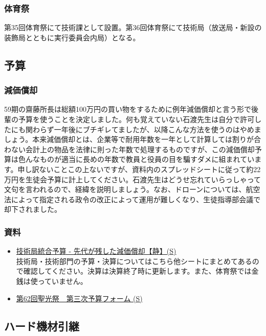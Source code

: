 \documentclass[dvipdfmx,jb5]{jarticle}
\begin{document}
\subsubsection{体育祭}
第35回体育祭にて技術課として設置。第36回体育祭にて技術局（放送局・新設の装飾局とともに実行委員会内局）となる。

\subsection{予算}\label{sec:予算}
\subsubsection{減価償却}
59期の齋藤所長は総額100万円の買い物をするために例年減価償却と言う形で後輩の予算を使うことを決定しました。何も覚えていない石渡先生は自分で許可したにも関わらず一年後にブチギレてましたが、以降こんな方法を使うのはやめましょう。本来減価償却とは、企業等で耐用年数を一年として計算しては割りが合わない会計上の物品を法律に則った年数で処理するものですが、この減価償却予算は色んなものが適当に長めの年数で教員と役員の目を騙すダメに組まれています。申し訳ないことこの上ないですが、資料内のスプレッドシートに従って約22万円を生徒会予算に計上してください。石渡先生はどうせ忘れていらっしゃって文句を言われるので、経緯を説明しましょう。なお、ドローンについては、航空法によって指定される政令の改正によって運用が難しくなり、生徒指導部会議で却下されました。

\subsubsection{資料}
\begin{itemize}
  \item \href{https://docs.google.com/spreadsheets/d/1cCHlfuN5FRR4mlCLDqwohB5WyJ2stmBoUM762DVa7aM/edit##gid=848718781}{技術局統合予算 - 先代が残した減価償却【静】(S)}
  \\ 技術局・技術部門の予算・決算についてはこちら他シートにまとめてあるので確認してください。決算は決算終了時に更新します。また、体育祭では金銭は使っていません。
  \item \href{https://docs.google.com/spreadsheets/d/1Tg_4jKLywMSQpIjNebaPKgTH9YmPqoLZAOGBRs1sr7I/edit?usp=sharing}{第62回聖光祭　第三次予算フォーム (S)}
\end{itemize}


\subsection{ハード機材引継}
\end{document}
